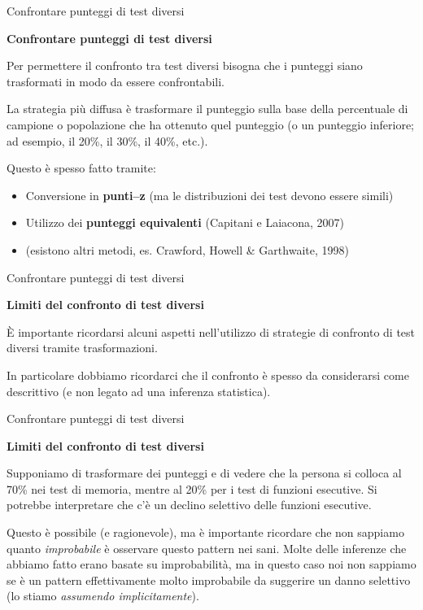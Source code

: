 \documentclass[
  ignorenonframetext,
  aspectratio=169,
]{beamer}
\providecommand{\tightlist}{%
  \setlength{\itemsep}{0pt}\setlength{\parskip}{0pt}}
\begin{document}
\begin{frame}{Confrontare punteggi di test diversi}
\label{confrontare-punteggi-di-test-diversi-1}
\begin{center}
  \textbf{Confrontare punteggi di test diversi}
\end{center}

Per permettere il confronto tra test diversi bisogna che i punteggi
siano trasformati in modo da essere confrontabili.

La strategia più diffusa è trasformare il punteggio sulla base della
percentuale di campione o popolazione che ha ottenuto quel punteggio (o
un punteggio inferiore; ad esempio, il 20\%, il 30\%, il 40\%, etc.).

Questo è spesso fatto tramite:

\begin{itemize}
\tightlist
\item
  Conversione in \textbf{punti--z} (ma le distribuzioni dei test devono
  essere simili)
\item
  Utilizzo dei \textbf{punteggi equivalenti} (Capitani e Laiacona, 2007)
\item
  (esistono altri metodi, es. Crawford, Howell \& Garthwaite, 1998)
\end{itemize}
\end{frame}

\begin{frame}{Confrontare punteggi di test diversi}
\label{confrontare-punteggi-di-test-diversi-2}
\begin{center}
  \textbf{Limiti del confronto di test diversi}
\end{center}
\vspace{2em}

È importante ricordarsi alcuni aspetti nell'utilizzo di strategie di
confronto di test diversi tramite trasformazioni.

In particolare dobbiamo ricordarci che il confronto è spesso da
considerarsi come descrittivo (e non legato ad una inferenza
statistica).
\end{frame}

\begin{frame}{Confrontare punteggi di test diversi}
\label{confrontare-punteggi-di-test-diversi-3}
\begin{center}
  \textbf{Limiti del confronto di test diversi}
\end{center}
\vspace{2em}

Supponiamo di trasformare dei punteggi e di vedere che la persona si
colloca al 70\% nei test di memoria, mentre al 20\% per i test di
funzioni esecutive. Si potrebbe interpretare che c'è un declino
selettivo delle funzioni esecutive.

Questo è possibile (e ragionevole), ma è importante ricordare che non
sappiamo quanto \emph{improbabile} è osservare questo pattern nei sani.
Molte delle inferenze che abbiamo fatto erano basate su improbabilità,
ma in questo caso noi non sappiamo se è un pattern effettivamente molto
improbabile da suggerire un danno selettivo (lo stiamo \emph{assumendo
implicitamente}).
\end{frame}
\end{document}
